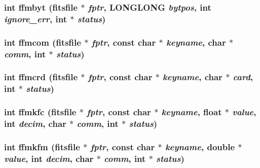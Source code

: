 \subsubsection{\setlength{\rightskip}{0pt plus 5cm}int ffmbyt (\bf{fitsfile} $\ast$ {\em fptr}, \bf{LONGLONG} {\em bytpos}, int {\em ignore\_\-err}, int $\ast$ {\em status})}\label{test_2shm__client_2fitsio_8h_d46d8495fae664fff9a6e7307bec570f}


\subsubsection{\setlength{\rightskip}{0pt plus 5cm}int ffmcom (\bf{fitsfile} $\ast$ {\em fptr}, const char $\ast$ {\em keyname}, char $\ast$ {\em comm}, int $\ast$ {\em status})}\label{test_2shm__client_2fitsio_8h_e21b2574f5fb36c2e208473ec81c6f18}


\subsubsection{\setlength{\rightskip}{0pt plus 5cm}int ffmcrd (\bf{fitsfile} $\ast$ {\em fptr}, const char $\ast$ {\em keyname}, char $\ast$ {\em card}, int $\ast$ {\em status})}\label{test_2shm__client_2fitsio_8h_0fb8a002759b6bdaa863bb456a57ad93}


\subsubsection{\setlength{\rightskip}{0pt plus 5cm}int ffmkfc (\bf{fitsfile} $\ast$ {\em fptr}, const char $\ast$ {\em keyname}, float $\ast$ {\em value}, int {\em decim}, char $\ast$ {\em comm}, int $\ast$ {\em status})}\label{test_2shm__client_2fitsio_8h_633909c19524d20d0f757d3454a079ca}


\subsubsection{\setlength{\rightskip}{0pt plus 5cm}int ffmkfm (\bf{fitsfile} $\ast$ {\em fptr}, const char $\ast$ {\em keyname}, double $\ast$ {\em value}, int {\em decim}, char $\ast$ {\em comm}, int $\ast$ {\em status})}\label{test_2shm__client_2fitsio_8h_61e22f498132381f2531f83d38d73928}


